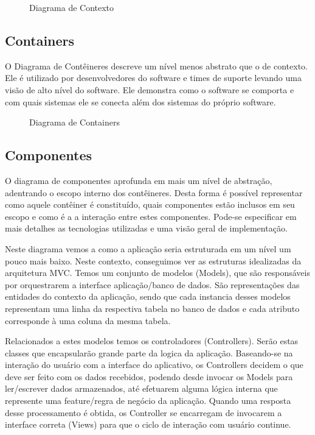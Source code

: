 \documentclass[12pt]{article}
\begin{document}
\begin{figure}[!h]
    \caption{\label{fig:diagContexto} Diagrama de Contexto}
\end{figure}
\vfill%


\pagebreak%


\subsection{Containers}
O Diagrama de Contêineres descreve um nível menos abstrato que o de contexto. Ele é utilizado por desenvolvedores do software e times de suporte levando uma visão de alto nível do software. Ele demonstra como o software se comporta e com quais sistemas ele se conecta além dos sistemas do próprio software.

\begin{figure}[!h]
    \caption{\label{fig:diagContainer} Diagrama de Containers}
\end{figure}
\vfill%


\pagebreak%


\subsection{Componentes}
O diagrama de componentes aprofunda em mais um nível de abstração, adentrando o escopo interno dos contêineres. Desta forma é possível representar como aquele contêiner é constituído, quais componentes estão inclusos em seu escopo e como é a a interação entre estes componentes. Pode-se especificar em mais detalhes as tecnologias utilizadas e uma visão geral de implementação.

Neste diagrama vemos a como a aplicação seria estruturada em um nível um pouco mais baixo. Neste contexto, conseguimos ver as estruturas idealizadas da arquitetura MVC. Temos um conjunto de modelos (Models), que são responsáveis por orquestrarem a interface aplicação/banco de dados. São representações das entidades do contexto da aplicação, sendo que cada instancia desses modelos representam uma linha da respectiva tabela no banco de dados e cada atributo corresponde à uma coluna da mesma tabela.

Relacionados a estes modelos temos os controladores (Controllers). Serão estas classes que encapsularão grande parte da logica da aplicação. Baseando-se na interação do usuário com a interface do aplicativo, os Controllers decidem o que deve ser feito com os dados recebidos, podendo desde invocar os Models para ler/escrever dados armazenados, até  efetuarem alguma lógica interna que represente uma feature/regra de negócio da aplicação. Quando uma resposta desse processamento é obtida, os Controller se encarregam de invocarem a interface correta (Views) para que o ciclo de interação com usuário continue.
\end{document}
